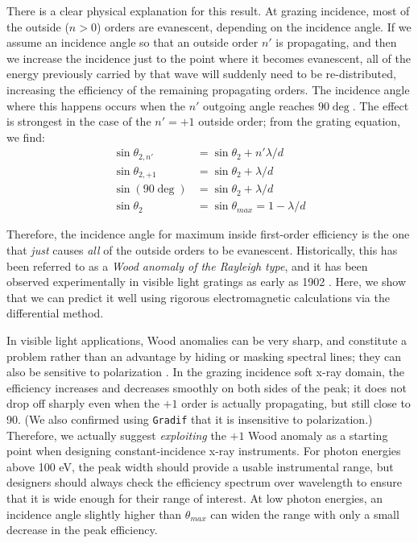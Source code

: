There is a clear physical explanation for this result.  At grazing incidence, most of the outside ($n>0$) orders are evanescent, depending on the incidence angle.  If we assume an incidence angle so that an outside order $n'$ is propagating, and then we increase the incidence just to the point where it becomes evanescent, all of the energy previously carried by that wave will suddenly need to be re-distributed, increasing the efficiency of the remaining propagating orders.  The incidence angle where this happens occurs when the $n'$ outgoing angle reaches $90\deg$.  The effect is strongest in the case of the $n'=+1$ outside order; from the grating equation, we find:
\begin{align}
\sin \theta_{2,n'} &= \sin \theta_2 + n' \lambda / d \\
\sin \theta_{2,+1} &= \sin \theta_2 + \lambda / d\\
\sin (90\deg) &=  \sin \theta_2 + \lambda / d \\
\sin \theta_2 &= \sin \theta_{max} = 1 - \lambda/d
\end{align}

Therefore, the incidence angle for maximum inside first-order efficiency is the one that \emph{just} causes \emph{all} of the outside orders to be evanescent.  Historically, this has been referred to as a \emph{Wood anomaly of the Rayleigh type}, and it has been observed experimentally in visible light gratings as early as 1902 \cite{Woo02}.  Here, we show that we can predict it well using rigorous electromagnetic calculations via the differential method.

In visible light applications, Wood anomalies can be very sharp, and constitute a problem rather than an advantage by hiding or masking spectral lines; they can also be sensitive to polarization \cite{Ste62}.  In the grazing incidence soft x-ray domain, 
 the efficiency increases and decreases smoothly on both sides of the peak; it does not drop off sharply even when the $+1$ order is actually propagating, but still close to 90\dg.  (We also confirmed using \texttt{Gradif} that it is insensitive to polarization.)  Therefore, we actually suggest \emph{exploiting} the $+1$ Wood anomaly as a starting point when designing constant-incidence x-ray instruments.  For photon energies above 100 eV, the peak width should provide a usable instrumental range, but designers should always check the efficiency spectrum over wavelength to ensure that it is wide enough for their range of interest.  At low photon energies, an incidence angle slightly higher than $\theta_{max}$ can widen the range with only a small decrease in the peak efficiency.

